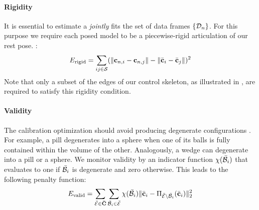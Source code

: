 \paragraph{Rigidity}
It is essential to estimate a  \emph{jointly} fits the set of data frames $\{ \mathcal{D}_n \}$. For this purpose we require each posed model to be a piecewise-rigid articulation of our rest pose. :
% 
\begin{equation}
E_{\text{rigid}} = 
\sum_{ij \in \mathcal{S}} (\| \mathbf{c}_{n,i} - \mathbf{c}_{n,j} \| - \| \bar{\mathbf{c}}_i - \bar{\mathbf{c}}_j \|)^2
\end{equation}
% 
Note that only a subset of the edges of our control skeleton, as illustrated in , are required to satisfy this rigidity condition.

\paragraph{Validity}
The calibration optimization should avoid producing degenerate configurations . For example, a pill degenerates into a sphere when one of its balls is fully contained within  the volume of the other. Analogously, a wedge can degenerate into a pill or a sphere. We monitor validity by an indicator function $\chi(\bar{\mathcal{B}}_i)$ that evaluates to one if $\bar{\mathcal{B}}_i$ is degenerate and zero otherwise.
% 
% 
This leads to the following  penalty function:
% 
\begin{equation}
E_{\text{valid}} = 
\sum_{\bar{\mathcal{E}} \in {\mathbf{\bar{C}}}}
\sum_{\bar{\mathcal{B}}_i \in \bar{\mathcal{E}}} 
\chi(\bar{\mathcal{B}}_i) 
\| \bar{\mathbf{c}}_i - \Pi_{\bar{\mathcal{E}} \setminus \bar{\mathcal{B}}_i}(\bar{\mathbf{c}}_i) \|_2^2
\end{equation}
% 
 

